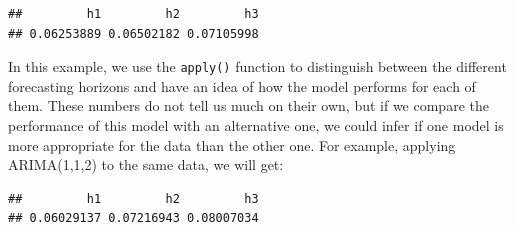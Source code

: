 \documentclass[]{book}
\newenvironment{Shaded}{\begin{snugshade}}{\end{snugshade}}
\newcommand{\DataTypeTok}[1]{\textcolor[rgb]{0.13,0.29,0.53}{#1}}
\newcommand{\DecValTok}[1]{\textcolor[rgb]{0.00,0.00,0.81}{#1}}
\newcommand{\KeywordTok}[1]{\textcolor[rgb]{0.13,0.29,0.53}{\textbf{#1}}}
\newcommand{\NormalTok}[1]{#1}
\newcommand{\OperatorTok}[1]{\textcolor[rgb]{0.81,0.36,0.00}{\textbf{#1}}}
\newcommand{\OtherTok}[1]{\textcolor[rgb]{0.56,0.35,0.01}{#1}}
\newcommand{\StringTok}[1]{\textcolor[rgb]{0.31,0.60,0.02}{#1}}
\theoremstyle{definition}
\theoremstyle{definition}
\theoremstyle{definition}
\theoremstyle{definition}
\theoremstyle{remark}
\begin{document}
\begin{Shaded}
\end{Shaded}

\begin{verbatim}
##         h1         h2         h3 
## 0.06253889 0.06502182 0.07105998
\end{verbatim}

In this example, we use the \texttt{apply()} function to distinguish between the different forecasting horizons and have an idea of how the model performs for each of them. These numbers do not tell us much on their own, but if we compare the performance of this model with an alternative one, we could infer if one model is more appropriate for the data than the other one. For example, applying ARIMA(1,1,2) to the same data, we will get:

\begin{Shaded}
\end{Shaded}

\begin{verbatim}
##         h1         h2         h3 
## 0.06029137 0.07216943 0.08007034
\end{verbatim}
\end{document}
